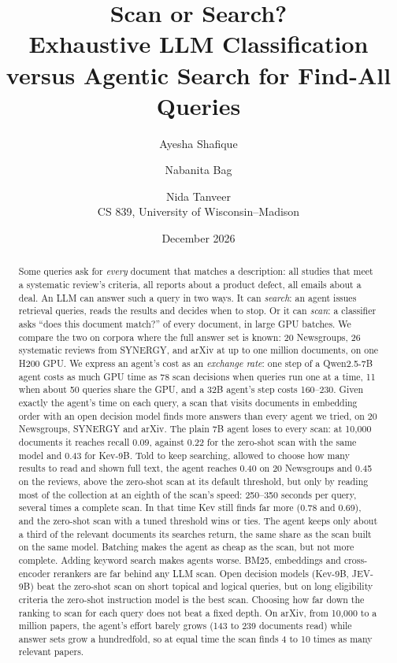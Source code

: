 \documentclass[11pt]{article}
\title{Scan or Search?\\[2pt]
\large Exhaustive LLM Classification versus Agentic Search for Find-All Queries}
\author{Ayesha Shafique \and Nabanita Bag \and Nida Tanveer\\[2pt]
\normalsize CS 839, University of Wisconsin--Madison}
\date{December 2026}
\begin{document}
\maketitle

\begin{abstract}
Some queries ask for \emph{every} document that matches a description: all
studies that meet a systematic review's criteria, all reports about a product
defect, all emails about a deal. An LLM can answer such a query in two ways. It
can \emph{search}: an agent issues retrieval queries, reads the results and
decides when to stop. Or it can \emph{scan}: a classifier asks ``does this
document match?'' of every document, in large GPU batches. We compare the two on
corpora where the full answer set is known: 20 Newsgroups, 26 systematic
reviews from SYNERGY, and arXiv at up to one million documents, on one H200 GPU.
We express an agent's cost as an \emph{exchange rate}: one step of a
Qwen2.5-7B agent costs as much GPU time as 78 scan decisions when queries run one
at a time, 11 when about 50 queries share the GPU, and a 32B agent's step costs
160--230. Given exactly the agent's time on each query, a scan that visits
documents in embedding order with an open decision model finds more answers
than every agent we tried, on 20 Newsgroups, SYNERGY and arXiv. The plain 7B
agent loses to every scan: at 10,000 documents it reaches recall 0.09, against
0.22 for the zero-shot scan with the same model and 0.43 for Kev-9B. Told to keep
searching, allowed to choose how many results to read and shown full text, the
agent reaches 0.40 on 20 Newsgroups and 0.45 on the reviews, above the zero-shot
scan at its default threshold, but only by reading most of the collection at an
eighth of the scan's speed: 250--350 seconds per query, several times a complete
scan. In that time Kev still finds far more (0.78 and 0.69), and the zero-shot
scan with a tuned threshold wins or ties. The agent keeps only about a third of
the relevant documents its searches return, the same share as the scan built on
the same model. Batching makes the agent as cheap as the scan, but not more
complete. Adding keyword search makes agents worse. BM25,
embeddings and cross-encoder rerankers are far behind any LLM scan. Open
decision models (Kev-9B, JEV-9B) beat the zero-shot scan on short topical and
logical queries, but on long eligibility criteria the zero-shot instruction
model is the best scan. Choosing how far down the ranking to scan for each
query does not beat a fixed depth. On arXiv, from 10,000 to a million
papers, the agent's effort barely grows (143 to 239 documents read) while
answer sets grow a hundredfold, so at equal time the scan finds 4 to 10 times
as many relevant papers.
\end{abstract}
\end{document}
